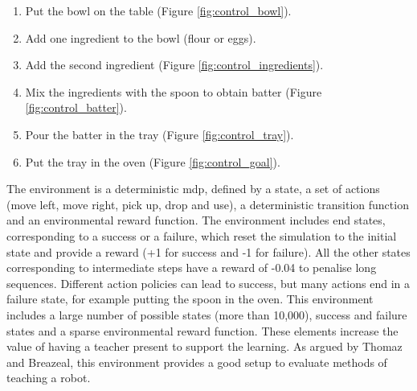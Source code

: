\begin{enumerate}
	\item Put the bowl on the table (Figure \ref{fig:control_bowl}).
	\item Add one ingredient to the bowl (flour or eggs).
	\item Add the second ingredient (Figure \ref{fig:control_ingredients}).
	\item Mix the ingredients with the spoon to obtain batter (Figure \ref{fig:control_batter}).
	\item Pour the batter in the tray (Figure \ref{fig:control_tray}).
	\item Put the tray in the oven (Figure \ref{fig:control_goal}).
\end{enumerate}

The environment is a deterministic \gls{mdp}, defined by a state, a set of actions (move left, move right, pick up, drop and use), a deterministic transition function and an environmental reward function. The environment includes end states, corresponding to a success or a failure, which reset the simulation to the initial state and provide a reward (+1 for success and -1 for failure). All the other states corresponding to intermediate steps have a reward of -0.04 to penalise long sequences. Different action policies can lead to success, but many actions end in a failure state, for example putting the spoon in the oven. This environment includes a large number of possible states (more than 10,000), success and failure states and a sparse environmental reward function. These elements increase the value of having a teacher present to support the learning. As argued by Thomaz and Breazeal, this environment provides a good setup to evaluate methods of teaching a robot.

